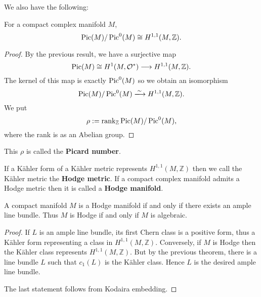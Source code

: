 \documentclass[12pt]{article}
\begin{document}
We also have the following:
\begin{theorem}
  For a compact complex manifold \(M\), \[
    \operatorname{Pic}(M)/\operatorname{Pic}^0(M)\cong H^{1,1}(M,\mathbb{Z})
  .\] 
\end{theorem}
\begin{proof}
  By the previous result, we have a surjective map \[
    \operatorname{Pic}(M)\cong H^1(M,\mathcal{O}^*)\longrightarrow H^{1,1}(M,\mathbb{Z})
  .\] The kernel of this map is exactly \(\operatorname{Pic}^0(M)\) so we obtain an
  isomorphism \[
    \op{Pic}(M)/\op{Pic}^0(M)\xrr{\sim}H^{1,1}(M,\mathbb{Z})
  .\] We put \[
    \rho:=\operatorname{rank}_{\mathbb{Z}}\operatorname{Pic}(M)/\operatorname{Pic}^0(M)
  ,\] where the rank is as an Abelian group.
\end{proof}
\begin{definition}
  This \(\rho\) is called the \textbf{Picard number}.
\end{definition}
\begin{definition}
  If a Kähler form of a Kähler metric represents \(H^{1,1}(M,\mathbb{Z})\) then we
  call the Kähler metric the \textbf{Hodge metric}. If a compact complex manifold 
  admits a Hodge metric then it is called a \textbf{Hodge manifold}.
\end{definition}
\begin{theorem}
  A compact manifold \(M\) is a Hodge manifold if and only if there exists an ample
  line bundle. Thus \(M\) is Hodge if and only if \(M\) is algebraic.
\end{theorem}
\begin{proof}
  If \(L\) is an ample line bundle, its first Chern class is a positive form, thus
  a Kähler form representing a class in \(H^{1,1}(M,\mathbb{Z})\). Conversely, if
  \(M\) is Hodge then the Kähler class represents \(H^{1,1}(M,\mathbb{Z})\). But by
  the previous theorem, there is a line bundle \(L\) such that \(c_1(L)\) is the
  Kähler class. Hence \(L\) is the desired ample line bundle.

  The last statement follows from Kodaira embedding.
\end{proof}
\end{document}
